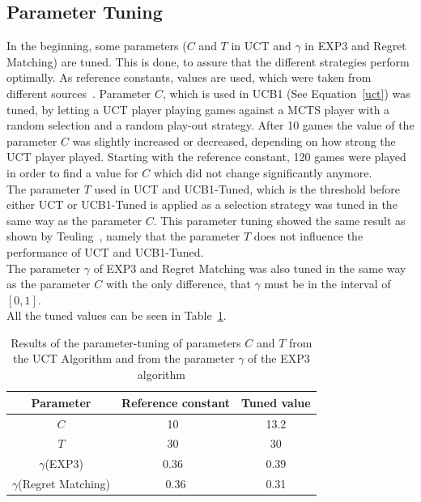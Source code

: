 \documentclass{article}
\begin{document}
\subsection{Parameter Tuning}
\label{subsec:parameter_tuning}
In the beginning, some parameters ($C$ and $T$ in UCT and $\gamma$ in EXP3 and Regret Matching) are tuned. This is done, to assure that the different strategies perform optimally. As reference constants, values are used, which were taken from different sources~\cite{teuling_tron,cig_paper}. Parameter $C$, which is used in UCB1 (See Equation~\ref{uct}) was tuned, by letting a UCT player playing games against a MCTS player with a random selection and a random play-out strategy. After 10 games the value of the parameter $C$ was slightly increased or decreased, depending on how strong the UCT player played. Starting with the reference constant, 120 games were played in order to find a value for $C$ which did not change significantly anymore.\\
The parameter $T$ used in UCT and UCB1-Tuned, which is the threshold before either UCT or UCB1-Tuned is applied as a selection strategy was tuned in the same way as the parameter $C$. This parameter tuning showed the same result as shown by Teuling~\cite{teuling_tron}, namely that the parameter $T$ does not influence the performance of UCT and UCB1-Tuned.\\
The parameter $\gamma$ of EXP3 and Regret Matching was also tuned in the same way as the parameter $C$ with the only difference, that $\gamma$ must be in the interval of $[0,1]$.\\
All the tuned values can be seen in Table~\ref{table:parameter_tuning}.

\begin{table}[b]\footnotesize
\caption{Results of the parameter-tuning of parameters $C$ and $T$ from the UCT Algorithm and from the parameter $\gamma$ of the EXP3 algorithm}
\centering
\begin{tabular}{|c||c|c|}
							\hline
Parameter			& Reference constant		& Tuned value	\\ \hline\hline
$C$				& 10~\cite{teuling_tron}	& 13.2		\\ \hline
$T$				& 30~\cite{teuling_tron}	& 30		\\ \hline
$\gamma$(EXP3)			& 0.36~\cite{cig_paper}		& 0.39		\\ \hline
$\gamma$(Regret Matching)	& 0.36				& 0.31		\\ \hline

\end{tabular}
\label{table:parameter_tuning}
\end{table}
\end{document}
